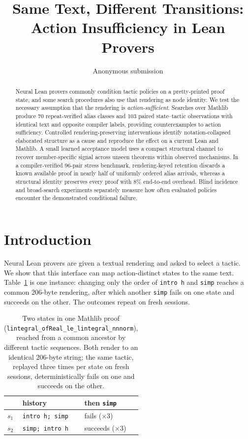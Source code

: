 \documentclass[11pt]{article}
\title{Same Text, Different Transitions:\\
Action Insufficiency in Lean Provers}
\author{Anonymous submission}
\begin{document}
\maketitle

\begin{abstract}
Neural Lean provers commonly condition tactic policies on a pretty-printed
proof state, and some search procedures also use that rendering as node
identity. We test the necessary assumption that the rendering is
\emph{action-sufficient}. Searches over Mathlib produce 70 repeat-verified
alias classes and 103 paired state--tactic observations with identical text and opposite
compiler labels, providing counterexamples to action sufficiency. Controlled
rendering-preserving interventions identify notation-collapsed elaborated
structure as a cause and reproduce the effect on a current Lean and Mathlib.
A small learned acceptance model uses a compact structural channel to recover
member-specific signal across unseen theorems within observed mechanisms. In a
compiler-verified 96-pair stress benchmark, rendering-keyed retention discards
a known available proof in nearly half of uniformly ordered alias arrivals,
whereas a structural identity preserves every proof with 8\% end-to-end
overhead. Blind incidence and broad-search experiments separately measure how
often evaluated policies encounter the demonstrated conditional failure.
\end{abstract}

\section{Introduction}

Neural Lean provers are given a textual rendering and asked to select a tactic.
We show that this interface can map action-distinct states to the same text.
Table~\ref{tab:witness} is one instance: changing
only the order of \texttt{intro h} and \texttt{simp} reaches a common 206-byte
rendering, after which another \texttt{simp} fails on one state and succeeds on
the other. The outcomes repeat on fresh sessions.

\begin{table}[t]\centering\small
\begin{tabular}{@{}lll@{}}
\toprule
 & history & then \texttt{simp} \\
\midrule
$s_1$ & \texttt{intro h; simp} & fails ($\times$3) \\
$s_2$ & \texttt{simp; intro h} & succeeds ($\times$3) \\
\bottomrule
\end{tabular}
\caption{Two states in one Mathlib proof
(\texttt{lintegral\_\allowbreak ofReal\_\allowbreak le\_\allowbreak lintegral\_\allowbreak nnnorm}), reached from a common
ancestor by different tactic sequences. Both render to an identical 206-byte
string; the same tactic, replayed three times per state on fresh sessions,
deterministically fails on one and succeeds on the other.}
\label{tab:witness}
\end{table}
\end{document}
